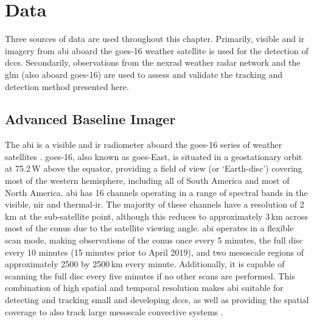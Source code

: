 \section{Data}

Three sources of data are used throughout this chapter.
Primarily, visible and \acrshort{ir} imagery from \acrshort{abi} aboard the \acrshort{goes}-16 weather satellite is used for the detection of \acrshort{dcc}s.
Secondarily, observations from the \acrshort{nexrad} weather radar network and the \acrshort{glm} (also aboard \acrshort{goes}-16) are used to assess and validate the tracking and detection method presented here.


\subsection{Advanced Baseline Imager} \label{sec:abi_data}


The \acrshort{abi} is a visible and \acrshort{ir} radiometer aboard the \acrshort{goes}-16 series of weather satellites \citep{schmit_closer_2016}.
\acrshort{goes}-16, also known as \acrshort{goes}-East, is situated in a geostationary orbit at 75.2\,\textdegree W above the equator, providing a field of view (or `Earth-disc') covering most of the western hemisphere, including all of South America and most of North America.
\acrshort{abi} has 16 channels operating in a range of spectral bands in the visible, \acrshort{nir} and thermal-\acrshort{ir}.
The majority of these channels have a resolution of 2\,\unit{km} at the sub-satellite point, although this reduces to approximately 3\,\unit{km} across most of the \acrfull{conus} due to the satellite viewing angle.
\acrshort{abi} operates in a flexible scan mode, making observations of the \acrshort{conus} once every 5 minutes, the full disc every 10 minutes (15 minutes prior to April 2019), and two mesoscale regions of approximately 2500 by 2500\,\unit{km} every minute.
Additionally, it is capable of scanning the full disc every five minutes if no other scans are performed.
This combination of high spatial and temporal resolution makes \acrshort{abi} suitable for detecting and tracking small and developing \acrshort{dcc}s, as well as providing the spatial coverage to also track large mesoscale convective systems \citep{heikenfeld_tobac_2019}.


